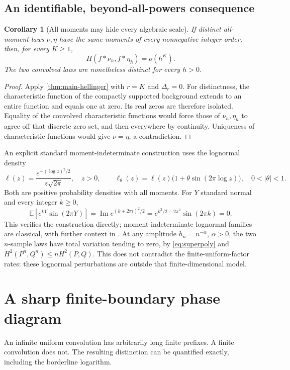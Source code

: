 \documentclass[11pt,a4paper]{article}
\numberwithin{equation}{section}
\newtheorem{corollary}[theorem]{Corollary}
\theoremstyle{definition}
\theoremstyle{remark}
\newcommand{\E}{\mathbb E}
\begin{document}
\subsection{An identifiable, beyond-all-powers consequence}
\begin{corollary}[All moments may hide every algebraic scale]
\label{cor:allmoments}
If distinct all-moment laws $\nu,\eta$ have the same moments of every
nonnegative integer order, then, for every $K\ge1$,
\begin{equation}
 H(f*\nu_h,f*\eta_h)=o(h^K).
 \label{eq:superpoly}
\end{equation}
The two convolved laws are nonetheless distinct for every $h>0$.
\end{corollary}
\begin{proof}
Apply \cref{thm:main-hellinger} with $r=K$ and $\Delta_r=0$.
For distinctness, the characteristic function of the compactly supported
background extends to an entire function and equals one at zero. Its real
zeros are therefore isolated. Equality of the convolved characteristic
functions would force those of $\nu_h,\eta_h$ to agree off that discrete
zero set, and then everywhere by continuity. Uniqueness of characteristic
functions would give $\nu=\eta$, a contradiction.
\end{proof}
An explicit standard moment-indeterminate construction uses the lognormal
density
\[
 \ell(z)=\frac{e^{-(\log z)^2/2}}{z\sqrt{2\pi}},\quad z>0,
 \qquad \ell_\theta(z)=\ell(z)\bigl(1+\theta\sin(2\pi\log z)\bigr),
 \quad 0<|\theta|<1.
\]
Both are positive probability densities with all moments. For $Y$ standard
normal and every integer $k\ge0$,
\[
 \E[e^{kY}\sin(2\pi Y)]
 =\operatorname{Im} e^{(k+2\pi i)^2/2}
 =e^{k^2/2-2\pi^2}\sin(2\pi k)=0.
\]
This verifies the construction directly; moment-indeterminate lognormal
families are classical, with further context in \cite{kleiber}.
At any amplitude $h_n=n^{-\alpha}$, $\alpha>0$, the two $n$-sample laws
have total variation tending to zero, by \eqref{eq:superpoly} and
$H^2(P^n,Q^n)\le nH^2(P,Q)$. This does not contradict the finite-uniform-factor
rates: these lognormal perturbations are outside that finite-dimensional
model.

\section{A sharp finite-boundary phase diagram}
\label{sec:phase}

An infinite uniform convolution has arbitrarily long finite prefixes.
A finite convolution does not. The resulting distinction can be quantified
exactly, including the borderline logarithm.
\end{document}
